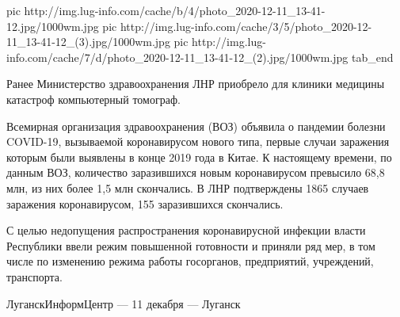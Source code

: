 	pic http://img.lug-info.com/cache/b/4/photo_2020-12-11_13-41-12.jpg/1000wm.jpg
	pic http://img.lug-info.com/cache/3/5/photo_2020-12-11_13-41-12_(3).jpg/1000wm.jpg
	pic http://img.lug-info.com/cache/7/d/photo_2020-12-11_13-41-12_(2).jpg/1000wm.jpg
tab_end
\fi

Ранее Министерство здравоохранения ЛНР
приобрело
для клиники медицины катастроф компьютерный томограф.

Всемирная организация здравоохранения (ВОЗ) объявила о пандемии болезни
COVID-19, вызываемой коронавирусом нового типа, первые случаи заражения которым
были выявлены в конце 2019 года в Китае. К настоящему времени, по данным ВОЗ,
количество заразившихся новым коронавирусом превысило 68,8 млн, из них более
1,5 млн скончались. В ЛНР подтверждены 1865 случаев заражения коронавирусом,
155 заразившихся скончались.

С целью недопущения распространения коронавирусной инфекции власти Республики
ввели режим повышенной готовности и приняли ряд мер, в том числе по изменению
режима работы госорганов, предприятий, учреждений, транспорта.

ЛуганскИнформЦентр — 11 декабря — Луганск

